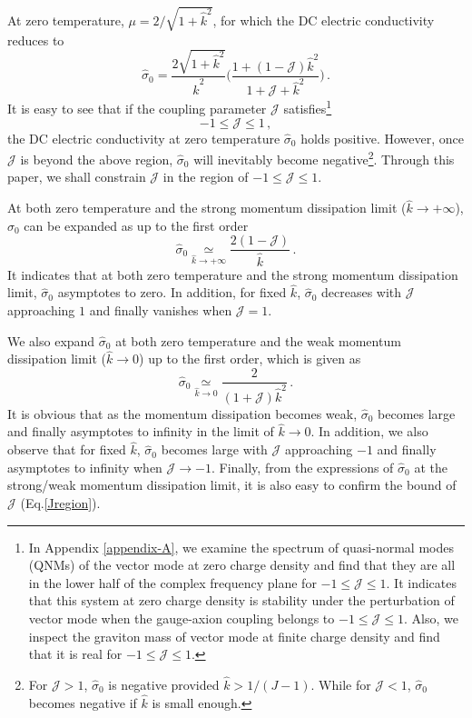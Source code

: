 \documentclass[preprint,onecolumn,nofootinbib]{revtex4}
\begin{document}
At zero temperature, $\mu=2/\sqrt{1+\hat{k}^2}$, for which the DC electric conductivity reduces to 
\begin{equation}
	\label{sigmavT0}
	\hat{\sigma}_0=\frac{2\sqrt{1+\hat{k}^2}}{\hat{k}^2}\Big(\frac{1+(1-\mathcal{J})\hat{k}^2}{1+\mathcal{J}+\hat{k}^2}\Big)\,.
\end{equation}
It is easy to see that if the coupling parameter $\mathcal{J}$ satisfies\footnote{In Appendix \ref{appendix-A}, we examine the spectrum of quasi-normal modes (QNMs) of the vector mode at zero charge density and find that they are all in the lower half of the complex frequency plane for $-1\leq\mathcal{J}\leq 1$. It indicates that this system at zero charge density is stability under the perturbation of vector mode when the gauge-axion coupling belongs to $-1\leq\mathcal{J}\leq 1$. Also, we inspect the graviton mass of vector mode at finite charge density and find that it is real for $-1\leq\mathcal{J}\leq 1$.}
\begin{equation}
	\label{Jregion}
	-1\leq\mathcal{J}\leq 1\,,
\end{equation}
the DC electric conductivity at zero temperature $\hat{\sigma}_0$ holds positive. However, once $\mathcal{J}$ is beyond the above region, $\hat{\sigma}_0$ will inevitably become negative\footnote{For $\mathcal{J}>1$, $\hat{\sigma}_0$ is negative provided $\hat{k}>1/(J-1)$. While for $\mathcal{J}<1$, $\hat{\sigma}_0$ becomes negative if $\hat{k}$ is small enough.}. Through this paper, we shall constrain $\mathcal{J}$ in the region of $-1\leq\mathcal{J}\leq 1$.

At both zero temperature and the strong momentum dissipation limit ($\hat{k} \rightarrow +\infty$), $\hat{\sigma}_0$ can be expanded as up to the first order
\begin{equation}
	\label{sigma0infty}
	\hat{\sigma}_0\underset{\hat{k} \rightarrow+\infty}{\simeq} \frac{2(1-\mathcal{J})}{\hat{k}}\,.
\end{equation}
It indicates that at both zero temperature and the strong momentum dissipation limit, $\hat{\sigma}_0$ asymptotes to zero. In addition, for fixed $\hat{k}$, $\hat{\sigma}_0$ decreases with $\mathcal{J}$ approaching $1$ and finally vanishes when $\mathcal{J}=1$.

We also expand $\hat{\sigma}_0$ at both zero temperature and the weak momentum dissipation limit ($\hat{k}\rightarrow 0$) up to the first order, which is given as
\begin{equation}
	\label{sigma00}
	\hat{\sigma}_0\underset{\hat{k} \rightarrow 0}{\simeq} \frac{2}{(1+\mathcal{J})\hat{k}^2}\,.
\end{equation}
It is obvious that as the momentum dissipation becomes weak, $\hat{\sigma}_0$ becomes large and finally asymptotes to infinity in the limit of $\hat{k}\rightarrow 0$. In addition, we also observe that for fixed $\hat{k}$, $\hat{\sigma}_0$ becomes large with $\mathcal{J}$ approaching $-1$ and finally asymptotes to infinity when $\mathcal{J}\rightarrow -1$. Finally, from the expressions of $\hat{\sigma}_0$ at the strong/weak momentum dissipation limit, it is also easy to confirm the bound of $\mathcal{J}$ (Eq.\eqref{Jregion}).
\end{document}
